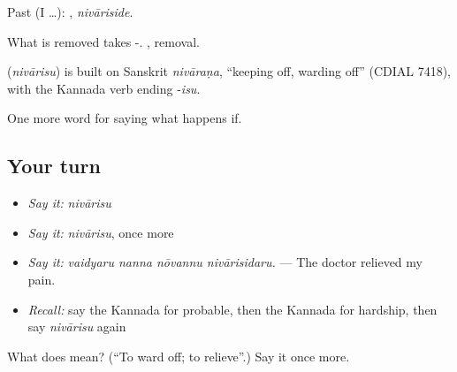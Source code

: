 Past (I …): , \emph{nivāriside}.

What is removed takes -. , removal.

\begin{cousinweb}
\textbf{} (\emph{nivārisu}) is built on Sanskrit \emph{nivāraṇa}, \textquotedblleft{}keeping off, warding off\textquotedblright{} (CDIAL 7418), with the Kannada verb ending -\emph{isu}.
\end{cousinweb}

\begin{grammarlens}[title={What you've built}]
One more word for saying what happens if.
\end{grammarlens}

\subsection*{Your turn}
\begin{itemize}
\raggedright
  \item \emph{Say it:} \emph{nivārisu}
  \item \emph{Say it:} \emph{nivārisu}, once more
  \item \emph{Say it:} \emph{vaidyaru nanna nōvannu nivārisidaru.} — The doctor relieved my pain.
  \item \emph{Recall:} say the Kannada for probable, then the Kannada for hardship, then say \emph{nivārisu} again
\end{itemize}

\begin{tcolorbox}[breakable,colback=teal!4,colframe=teal!35!black,title={Before you move on}]
What does  mean? (\textquotedblleft{}To ward off; to relieve\textquotedblright{}.) Say it once more.
\end{tcolorbox}
